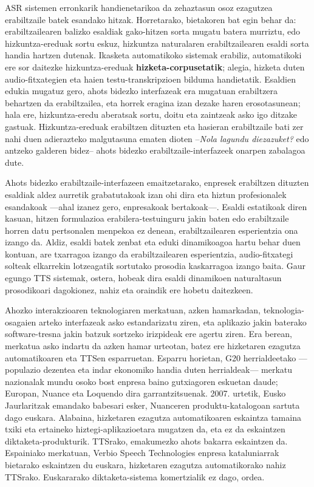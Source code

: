\begin{multicols}{2}
ASR sistemen erronkarik handienetarikoa da zehaztasun osoz ezagutzea erabiltzaile batek esandako hitzak. Horretarako, bietakoren bat egin behar da: erabiltzailearen balizko esaldiak gako-hitzen sorta mugatu batera murriztu, edo hizkuntza-ereduak sortu eskuz, hizkuntza naturalaren erabiltzailearen esaldi sorta handia hartzen dutenak. Ikasketa automatikoko sistemak erabiliz, automatikoki ere sor daitezke hizkuntza-ereduak \textbf{hizketa-corpusetatik}; alegia, hizketa duten audio-fitxategien eta haien testu-transkripzioen bilduma handietatik. Esaldien edukia mugatuz gero, ahots bidezko interfazeak era mugatuan erabiltzera behartzen da erabiltzailea, eta horrek eragina izan dezake haren erosotasunean; hala ere, hizkuntza-eredu aberatsak sortu, doitu eta zaintzeak asko igo ditzake gastuak. Hizkuntza-ereduak erabiltzen dituzten eta hasieran erabiltzaile bati zer nahi duen adierazteko malgutasuna ematen dioten --\textit{Nola lagundu diezazuket?} edo antzeko galderen bidez-- ahots bidezko erabiltzaile-interfazeek onarpen zabalagoa dute.

Ahots bidezko erabiltzaile-interfazeen emaitzetarako, enpresek erabiltzen dituzten esaldiak aldez aurretik grabatutakoak izan ohi dira eta hiztun profesionalek esandakoak —ahal izanez gero, enpresakoak bertakoak—. Esaldi estatikoak diren kasuan, hitzen formulazioa erabilera-testuinguru jakin baten edo erabiltzaile horren datu pertsonalen menpekoa ez denean, erabiltzailearen esperientzia ona izango da. Aldiz, esaldi batek zenbat eta eduki dinamikoagoa hartu behar duen kontuan, are txarragoa izango da erabiltzailearen esperientzia,  audio-fitxategi solteak elkarrekin lotzeagatik sortutako prosodia kaskarragoa izango baita. Gaur egungo TTS sistemak, ostera, hobeak dira esaldi dinamikoen naturaltasun prosodikoari dagokionez, nahiz eta oraindik ere hobetu daitezkeen. 

Ahozko interakzioaren teknologiaren merkatuan, azken hamarkadan, teknologia-osagaien arteko interfazeak asko estandarizatu ziren, eta aplikazio jakin baterako software-tresna jakin batzuk sortzeko irizpideak ere agertu ziren. Era berean, merkatua asko indartu da azken hamar urteotan, batez ere hizketaren ezagutza automatikoaren eta TTSen esparruetan. Esparru horietan, G20 herrialdeetako —populazio dezentea eta indar ekonomiko handia duten herrialdeak— merkatu nazionalak mundu osoko bost enpresa baino gutxiagoren eskuetan daude; Europan, Nuance eta Loquendo dira garrantzitsuenak. 2007. urtetik, Eusko Jaurlaritzak emandako babesari esker, Nuanceren produktu-katalogoan sartuta dago euskara. Alabaina, hizketaren ezagutza automatikoaren eskaintza tamaina txiki eta ertaineko hiztegi-aplikazioetara mugatzen da, eta ez da eskaintzen diktaketa-produkturik. TTSrako, emakumezko ahots bakarra eskaintzen da. Espainiako merkatuan, Verbio Speech Technologies \cite{BAS-Nota29}  enpresa kataluniarrak bietarako eskaintzen du euskara, hizketaren ezagutza automatikorako nahiz TTSrako. Euskararako diktaketa-sistema komertzialik ez dago, ordea. 


\end{multicols}
